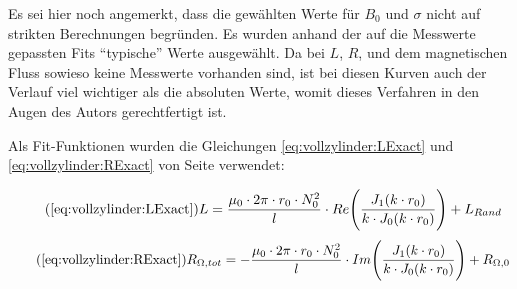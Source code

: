 {\begin{minipage}[t]{0.33\textwidth}
        Es sei  hier noch  angemerkt, dass die  gew\"ahlten Werte  f\"ur $B_0$
        und $\sigma$  nicht auf  strikten Berechnungen  begr\"unden. Es wurden
        anhand  der  auf  die  Messwerte  gepassten  Fits  ``typische''  Werte
        ausgew\"ahlt. Da  bei $L$,  $R$,  und dem  magnetischen Fluss  sowieso
        keine Messwerte vorhanden sind, ist bei diesen Kurven auch der Verlauf
        viel wichtiger als die absoluten  Werte, womit dieses Verfahren in den
        Augen des Autors gerechtfertigt ist.

        Als         Fit-Funktionen       wurden        die         Gleichungen
        \ref{eq:vollzylinder:LExact}   und  \ref{eq:vollzylinder:RExact}   von
        Seite \pageref{eq:vollzylinder:LExact} verwendet:

        \begin{equation}
            \tag{\ref{eq:vollzylinder:LExact}}
            L = \frac{\mu_0 \cdot 2\pi \cdot r_0 \cdot N_0^2}{l} \cdot Re \Biggl(\frac{J_1 (k \cdot r_0)}{k \cdot J_0 (k \cdot r_0)} \Biggr) + L_{Rand}
        \end{equation}
        \begin{equation}
            \tag{\ref{eq:vollzylinder:RExact}}
            R_{\Omega,tot} = - \frac{\mu_0 \cdot 2\pi \cdot r_0 \cdot N_0^2}{l} \cdot Im \Biggl(\frac{J_1 (k \cdot r_0)}{k \cdot J_0 (k \cdot r_0)} \Biggr) + R_{\Omega,0}
        \end{equation}

        \vspace{2em}
        \begin{minipage}[c][][b]{0.5\textwidth}
            \vspace{0pt}
            
        \end{minipage}%
        \begin{minipage}[c][][b]{0.5\textwidth}
            \vspace{0pt}
            
        \end{minipage}
	\end{minipage}%
	\begin{minipage}[t]{0.67\textwidth}
        \vspace{0mm}
        \resizebox{.95\textwidth}{!}{}
        \label{fig:alu:freq:L}
        \resizebox{.95\textwidth}{!}{}
        \label{fig:alu:freq:R}
	\end{minipage}

}
